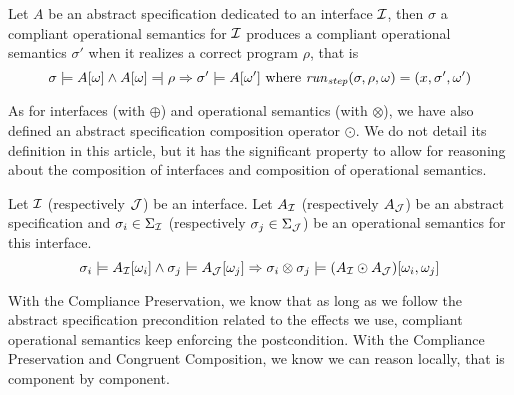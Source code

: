 \begin{theorem}
  Let $A$ be an abstract specification dedicated to an interface $\mathcal{I}$, then
  $\sigma$ a compliant operational semantics for $\mathcal{I}$ produces a compliant
  operational semantics $\sigma'$ when it realizes a correct program $\rho$,
  that is
  \[
    \sigma \models A[\omega] \wedge A[\omega] \modelssym \rho \Rightarrow
    \sigma' \models A[\omega'] \text{ where
    }\func{run}_{\func{step}}(\sigma, \rho, \omega) = (x, \sigma', \omega')
  \]
\end{theorem}

As for interfaces (with $\oplus$) and operational semantics (with $\otimes$), we
have also defined an abstract specification composition operator $\odot$.
%
We do not detail its definition in this article, but it has the significant
property to allow for reasoning about the composition of interfaces and
composition of operational semantics.

\begin{theorem}
  Let $\mathcal{I}$ (respectively $\mathcal{J}$) be an interface.
  Let $A_{\mathcal{I}}$
  (respectively $A_{\mathcal{J}}$) be an abstract specification and $\sigma_i
  \in \Sigma_{\mathcal{I}}$ (respectively $\sigma_j \in \Sigma_{\mathcal{J}}$) be an
  operational semantics for this interface.
  \[ \sigma_i \models A_{\mathcal{I}}[\omega_i] \wedge \sigma_j \models A_{\mathcal{J}}[\omega_j]
    \Rightarrow \sigma_i \otimes \sigma_j \models
    (A_{\mathcal{I}} \odot A_{\mathcal{J}})[\omega_i, \omega_j]
  \]
\end{theorem}


With the Compliance Preservation, we know that as long as we follow the abstract
specification precondition related to the effects we use, compliant operational
semantics keep enforcing the postcondition.
%
With the Compliance Preservation and Congruent Composition, we know we can
reason locally, that is component by component.

